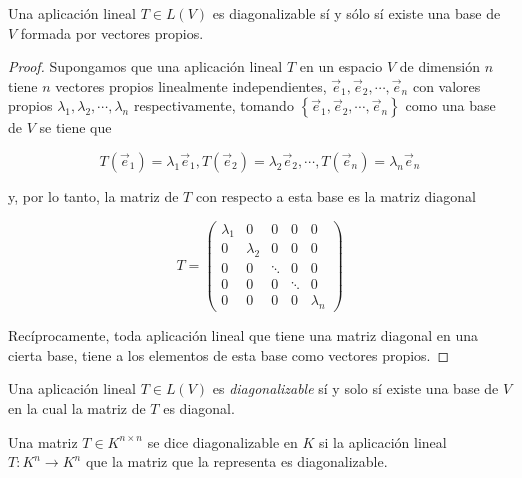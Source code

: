 \begin{theorem}
\label{PROPOSICION3}
Una aplicación lineal  $T\in L(V)$ es diagonalizable sí y sólo sí existe una base de $V$ formada por vectores propios.

\begin{proof}

Supongamos que una aplicación lineal $T$ en un espacio $V$ de dimensión $n$ tiene $n$ vectores propios linealmente independientes, $\vec{e}_1,\vec{e}_2, \cdots ,\vec{e}_n$ con valores propios $\lambda_1,\lambda_2, \cdots ,\lambda_n$ respectivamente, tomando $\left\{\vec{e}_1,\vec{e}_2, \cdots,\vec{e}_n\right\}$ como una base de $V$ se tiene que 

$$T(\vec{e}_1)=\lambda_1\vec{e}_1, T(\vec{e}_2)=\lambda_2\vec{e}_2, \cdots,T(\vec{e}_n)=\lambda_n\vec{e}_n$$

\bigskip

\noindent
y, por lo tanto, la matriz de $T$ con respecto a esta base es la matriz diagonal

\bigskip


$$T=\left(\begin{array}{ccccc} \lambda_1 & 0 &  0 & 0 &  0\\ 0 &  \lambda_2 & 0  & 0 & 0
\\ 0 & 0  &\ddots   &  0 &   0  \\   0 & 0 &  0 &\ddots   &  0   \\ 0 & 0 & 0 & 0 & \lambda_n
\end{array}
 \right)$$



\bigskip


Recíprocamente, toda aplicación lineal que tiene una matriz diagonal en una cierta base, tiene a los elementos de esta base como vectores propios. 


\bigskip


\end{proof}

\end{theorem}

\bigskip

\begin{remark}
Una aplicación lineal  $T\in L(V)$ es \textit{diagonalizable} sí y solo sí existe una base de $V$ en la cual la matriz de $T$ es diagonal.
\end{remark}


\begin{definition}\label{Diag}

Una matriz $T\in K^{n \times n}$ se dice diagonalizable en $K$ si la aplicación lineal  $T: K^n \rightarrow  K^n$ que la matriz que la representa es diagonalizable.

\end{definition}

